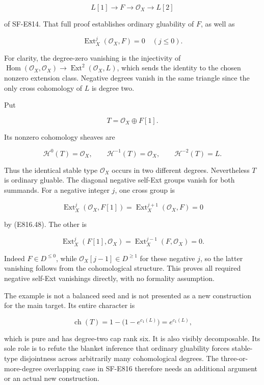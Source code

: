 \[
 L[1]\longrightarrow F\longrightarrow\mathcal O_X
            \longrightarrow L[2]
 \tag{E816.47}
\]

of SF-E814. That full proof establishes ordinary gluability of \(F\), as
well as

\[
 \operatorname{Ext}^j_X(\mathcal O_X,F)=0\quad(j\le0).
 \tag{E816.48}
\]

For clarity, the degree-zero vanishing is the injectivity of
\(\operatorname{Hom}(\mathcal O_X,\mathcal O_X)\to
\operatorname{Ext}^2(\mathcal O_X,L)\), which sends the identity to the
chosen nonzero extension class. Negative degrees vanish in the same
triangle since the only cross cohomology of \(L\) is degree two.

Put

\[
 T=\mathcal O_X\oplus F[1].
 \tag{E816.49}
\]

Its nonzero cohomology sheaves are

\[
 \mathcal H^0(T)=\mathcal O_X,\qquad
 \mathcal H^{-1}(T)=\mathcal O_X,\qquad
 \mathcal H^{-2}(T)=L.
 \tag{E816.50}
\]

Thus the identical stable type \(\mathcal O_X\) occurs in two different
degrees. Nevertheless \(T\) is ordinary gluable. The diagonal negative
self-Ext groups vanish for both summands. For a negative integer \(j\),
one cross group is

\[
 \operatorname{Ext}^j_X(\mathcal O_X,F[1])
     =\operatorname{Ext}^{j+1}_X(\mathcal O_X,F)=0
\]

by (E816.48). The other is

\[
 \operatorname{Ext}^j_X(F[1],\mathcal O_X)
     =\operatorname{Ext}^{j-1}_X(F,\mathcal O_X)=0.
\]

Indeed \(F\in D^{\le0}\), while \(\mathcal O_X[j-1]\in D^{\ge1}\) for
these negative \(j\), so the latter vanishing follows from the
cohomological structure. This proves all required negative self-Ext
vanishings directly, with no formality assumption.

The example is not a balanced seed and is not presented as a new
construction for the main target. Its entire character is

\[
 \operatorname{ch}(T)=1-\bigl(1-e^{c_1(L)}\bigr)
                   =e^{c_1(L)},
 \tag{E816.51}
\]

which is pure and has degree-two cap rank six. It is also visibly
decomposable. Its sole role is to refute the blanket inference that
ordinary gluability forces stable-type disjointness across arbitrarily
many cohomological degrees. The three-or-more-degree overlapping case in
SF-E816 therefore needs an additional argument or an actual new
construction.
